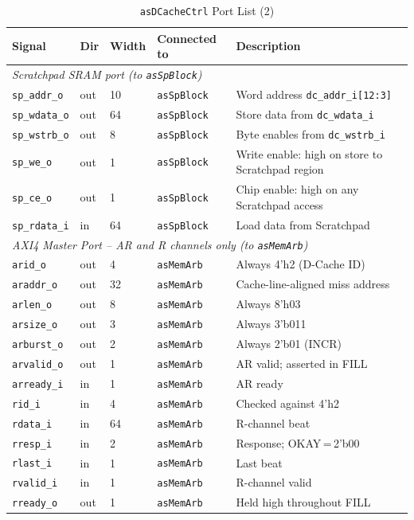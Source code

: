 \begin{table}[H]
\caption{\texttt{asDCacheCtrl} Port List (2)}
\label{tab:asDCacheCtrlPorts2}
\centering
\begin{tabularx}{\textwidth}{|l |l |l |l |X|}
  \hline
  Signal & Dir & Width & Connected to & Description \\
  \hline
  \hline
  \multicolumn{5}{|l|}{\textit{Scratchpad SRAM port (to \texttt{asSpBlock})}} \\
  \hline
  \texttt{sp\_addr\_o}  & out & 10 & \texttt{asSpBlock} & Word address \texttt{dc\_addr\_i[12:3]} \\
  \hline
  \texttt{sp\_wdata\_o} & out & 64 & \texttt{asSpBlock} & Store data from \texttt{dc\_wdata\_i} \\
  \hline
  \texttt{sp\_wstrb\_o} & out & 8  & \texttt{asSpBlock} & Byte enables from \texttt{dc\_wstrb\_i} \\
  \hline
  \texttt{sp\_we\_o}    & out & 1  & \texttt{asSpBlock} & Write enable: high on store to Scratchpad region \\
  \hline
  \texttt{sp\_ce\_o}    & out & 1  & \texttt{asSpBlock} & Chip enable: high on any Scratchpad access \\
  \hline
  \texttt{sp\_rdata\_i} & in  & 64 & \texttt{asSpBlock} & Load data from Scratchpad \\
  \hline
  \multicolumn{5}{|l|}{\textit{AXI4 Master Port -- AR and R channels only (to \texttt{asMemArb})}} \\
  \hline
  \texttt{arid\_o}    & out & 4  & \texttt{asMemArb} & Always 4'h2 (D-Cache ID) \\
  \hline
  \texttt{araddr\_o}  & out & 32 & \texttt{asMemArb} & Cache-line-aligned miss address \\
  \hline
  \texttt{arlen\_o}   & out & 8  & \texttt{asMemArb} & Always 8'h03 \\
  \hline
  \texttt{arsize\_o}  & out & 3  & \texttt{asMemArb} & Always 3'b011 \\
  \hline
  \texttt{arburst\_o} & out & 2  & \texttt{asMemArb} & Always 2'b01 (INCR) \\
  \hline
  \texttt{arvalid\_o} & out & 1  & \texttt{asMemArb} & AR valid; asserted in FILL \\
  \hline
  \texttt{arready\_i} & in  & 1  & \texttt{asMemArb} & AR ready \\
  \hline
  \texttt{rid\_i}     & in  & 4  & \texttt{asMemArb} & Checked against 4'h2 \\
  \hline
  \texttt{rdata\_i}   & in  & 64 & \texttt{asMemArb} & R-channel beat \\
  \hline
  \texttt{rresp\_i}   & in  & 2  & \texttt{asMemArb} & Response; OKAY\,=\,2'b00 \\
  \hline
  \texttt{rlast\_i}   & in  & 1  & \texttt{asMemArb} & Last beat \\
  \hline
  \texttt{rvalid\_i}  & in  & 1  & \texttt{asMemArb} & R-channel valid \\
  \hline
  \texttt{rready\_o}  & out & 1  & \texttt{asMemArb} & Held high throughout FILL \\
  \hline
\end{tabularx}
\end{table}



